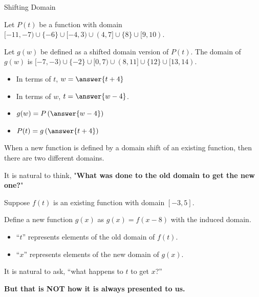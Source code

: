 \documentclass{ximera}
\begin{document}
\begin{example} Shifting Domain


Let $P(t)$ be a function with domain $[-11, -7) \cup \{ -6 \} \cup [-4,3) \cup (4, 7] \cup \{ 8 \} \cup [9, 10)$.

Let $g(w)$ be defined as a shifted domain version of $P(t)$.  The domain of $g(w)$ is $[-7, -3) \cup \{ -2 \} \cup [0,7) \cup (8, 11] \cup \{ 12 \} \cup [13, 14)$.

\begin{itemize}
\item In terms of $t$, $w = \answer{t+4}$ 
\item In terms of $w$, $t = \answer{w-4}$.  
\end{itemize}


\begin{itemize}
\item $g(w) = P\left(\answer{w-4}\right)$ 
\item $P(t) = g\left(\answer{t+4}\right)$ 
\end{itemize}

\end{example}














When a new function is defined by a domain shift of an existing function, then there are two different domains.  


It is natural to think, "\textbf{\textcolor{purple!85!blue}{What was done to the old domain to get the new one?}}"

Suppose $f(t)$ is an existing function with domain $[-3, 5]$.

Define a new function $g(x)$ as $g(x) = f(x-8)$ with the induced domain.



\begin{itemize}
\item ``$t$'' represents elements of the old domain of $f(t)$.  
\item ``$x$'' represents elements of the new domain of $g(x)$.  
\end{itemize}




It is natural to ask, ``what happens to $t$ to get $x$?''  



\begin{center}
\textbf{\textcolor{red!70!black}{But that is NOT how it is always presented to us.}}
\end{center}
\end{document}

